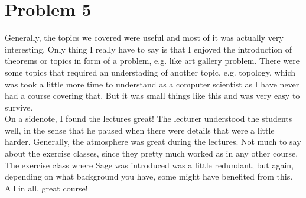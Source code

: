 \documentclass[a4paper]{article}
\begin{document}
\section{Problem 5}
Generally, the topics we covered were useful and most of it was actually very interesting. Only thing I really have to say is that I enjoyed the introduction of theorems or topics in form of a problem, e.g. like art gallery problem. There were some topics that required an understading of another topic, e.g. topology, which was took a little more time to understand as a computer scientist as I have never had a course covering that. But it was small things like this and was very easy to survive. \\
On a sidenote, I found the lectures great! The lecturer understood the students well, in the sense that he paused when there were details that were a little harder. Generally, the atmosphere was great during the lectures. Not much to say about the exercise classes, since they pretty much worked as in any other course. The exercise class where Sage was introduced was a little redundant, but again, depending on what background you have, some might have benefited from this. All in all, great course!
\end{document}
